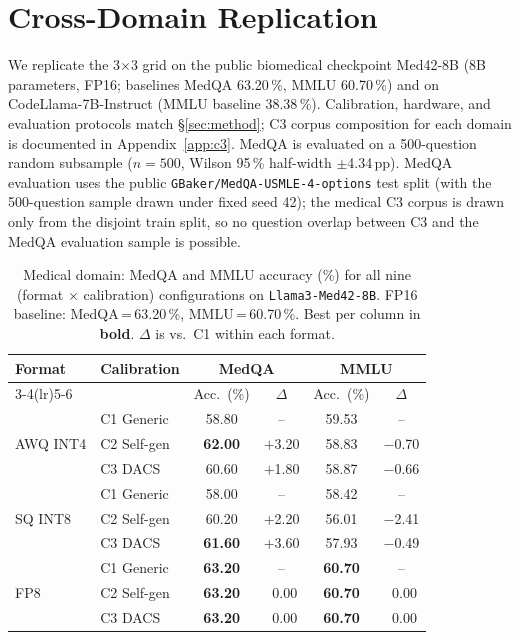 \documentclass[11pt]{article}
\newcommand{\dacs}{DACS}
\begin{document}
\section{Cross-Domain Replication}
\label{sec:crossdomain}

\begin{sloppypar}
We replicate the 3$\times$3 grid on the public biomedical checkpoint
Med42-8B (8B parameters, FP16; baselines MedQA 63.20\,\%,
MMLU 60.70\,\%) and on CodeLlama-7B-Instruct
(MMLU baseline 38.38\,\%).  Calibration, hardware, and evaluation
protocols match \S\ref{sec:method}; C3 corpus composition for each
domain is documented in Appendix~\ref{app:c3}.  MedQA is evaluated
on a 500-question random subsample ($n=500$, Wilson 95\,\%
half-width $\pm$4.34\,pp). MedQA evaluation uses the public
\texttt{GBaker/MedQA-USMLE-4-options} test split (with the
500-question sample drawn under fixed seed 42); the medical C3
corpus is drawn only from the disjoint train split, so no question
overlap between C3 and the MedQA evaluation sample is possible.
\end{sloppypar}

\begin{table}[t]
\centering
\caption{Medical domain: MedQA and MMLU accuracy (\%) for all nine
         (format $\times$ calibration) configurations on
         \texttt{Llama3-Med42-8B}.  FP16 baseline: MedQA\,=\,63.20\,\%,
         MMLU\,=\,60.70\,\%.  Best per column in \textbf{bold}.
         $\Delta$ is vs.\ C1 within each format.}
\label{tab:medical}
\small
\begin{tabular}{llcccc}
\toprule
\multirow{2}{*}{\textbf{Format}} &
\multirow{2}{*}{\textbf{Calibration}} &
\multicolumn{2}{c}{\textbf{MedQA}} &
\multicolumn{2}{c}{\textbf{MMLU}} \\
\cmidrule(lr){3-4}\cmidrule(lr){5-6}
& & Acc.\ (\%) & $\Delta$ & Acc.\ (\%) & $\Delta$ \\
\midrule
\multirow{3}{*}{AWQ INT4}
  & C1 Generic  & 58.80 & --       & 59.53 & -- \\
  & C2 Self-gen & \textbf{62.00} & $+$3.20 & 58.83 & $-$0.70 \\
  & C3 \dacs{}  & 60.60 & $+$1.80  & 58.87 & $-$0.66 \\
\midrule
\multirow{3}{*}{SQ INT8}
  & C1 Generic  & 58.00 & --       & 58.42 & -- \\
  & C2 Self-gen & 60.20 & $+$2.20  & 56.01 & $-$2.41 \\
  & C3 \dacs{}  & \textbf{61.60} & $+$3.60  & 57.93 & $-$0.49 \\
\midrule
\multirow{3}{*}{FP8}
  & C1 Generic  & \textbf{63.20} & --       & \textbf{60.70} & -- \\
  & C2 Self-gen & \textbf{63.20} & $~~$0.00 & \textbf{60.70} & $~~$0.00 \\
  & C3 \dacs{}  & \textbf{63.20} & $~~$0.00 & \textbf{60.70} & $~~$0.00 \\
\bottomrule
\end{tabular}
\end{table}
\end{document}
